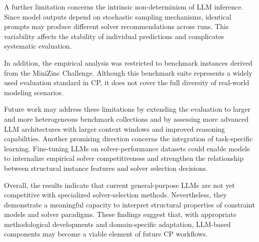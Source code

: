 \documentclass[../../main]{subfiles}
\begin{document}
A further limitation concerns the intrinsic non-determinism of LLM inference. Since model outputs depend on stochastic sampling mechanisms, identical prompts may produce different solver recommendations across runs. This variability affects the stability of individual predictions and complicates systematic evaluation.

In addition, the empirical analysis was restricted to benchmark instances derived from the MiniZinc Challenge. Although this benchmark suite represents a widely used evaluation standard in CP, it does not cover the full diversity of real-world modeling scenarios.

Future work may address these limitations by extending the evaluation to larger and more heterogeneous benchmark collections and by assessing more advanced LLM architectures with larger context windows and improved reasoning capabilities. Another promising direction concerns the integration of task-specific learning. Fine-tuning LLMs on solver-performance datasets could enable models to internalize empirical solver competitiveness and strengthen the relationship between structural instance features and solver selection decisions.

Overall, the results indicate that current general-purpose LLMs are not yet competitive with specialized solver-selection methods. Nevertheless, they demonstrate a meaningful capacity to interpret structural properties of constraint models and solver paradigms. These findings suggest that, with appropriate methodological developments and domain-specific adaptation, LLM-based components may become a viable element of future CP workflows.
\end{document}
